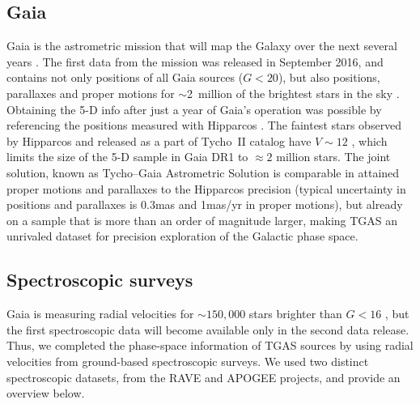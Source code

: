 \documentclass[apj, twocolappendix, numberedappendix, appendixfloats]{emulateapj}
\begin{document}
\subsection{Gaia}
\label{gaia}
Gaia is the astrometric mission that will map the Galaxy over the next several years \citep{perryman2001}.
The first data from the mission was released in September 2016, and contains not only positions of all Gaia sources ($G<20$), but also positions, parallaxes and proper motions for $\sim$2~million of the brightest stars in the sky \citep{gaiadr1, gaiamission}.
Obtaining the 5-D info after just a year of Gaia's operation was possible by referencing the positions measured with Hipparcos \citep{michalik2015}.
The faintest stars observed by Hipparcos \citep{hipparcos, vleeuwen2007} and released as a part of Tycho~II catalog have $V\sim12$ \citep{hog2000}, which limits the size of the 5-D sample in Gaia DR1 to $\approx2$ million stars.
The joint solution, known as Tycho--Gaia Astrometric Solution \citep[TGAS,][]{gaiaastrometry} is comparable in attained proper motions and parallaxes to the Hipparcos precision (typical uncertainty in positions and parallaxes is 0.3\;mas and 1\;mas/yr in proper motions), but already on a sample that is more than an order of magnitude larger, making TGAS an unrivaled dataset for precision exploration of the Galactic phase space.

\subsection{Spectroscopic surveys}
\label{rvsurveys}
Gaia is measuring radial velocities for $\sim150,000$ stars brighter than $G<16$ \citep{gaiamission}, but the first spectroscopic data will become available only in the second data release.
Thus, we completed the phase-space information of TGAS sources by using radial velocities from ground-based spectroscopic surveys.
We used two distinct spectroscopic datasets, from the RAVE and APOGEE projects, and provide an overview below.
\end{document}
